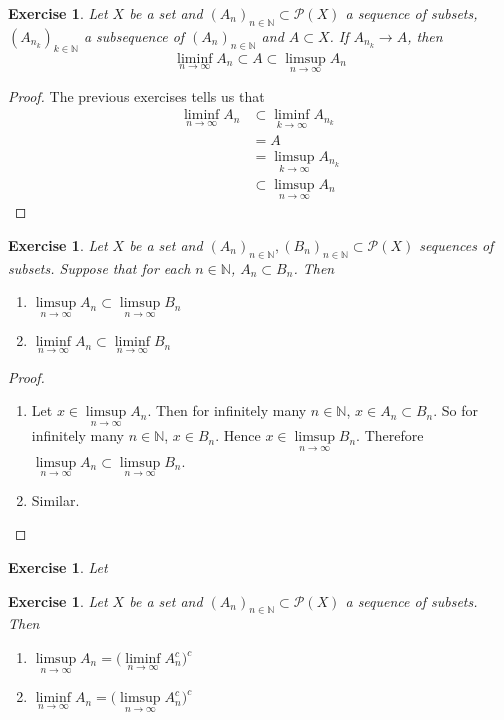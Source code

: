 \documentclass[12pt]{amsart}
\newtheorem{ex}[thm]{Exercise}
\newcommand{\N}{\mathbb{N}}
\newcommand{\MP}{\mathcal{P}}
\begin{document}
\begin{ex}
Let $X$ be a set and $(A_n)_{n \in \N} \subset \MP(X)$ a sequence of subsets, $(A_{n_k})_{k \in \N}$ a subsequence of $(A_n)_{n \in \N}$ and $A \subset X$. If $A_{n_k} \rightarrow A$, then $$\liminf\limits_{n \rightarrow \infty}A_n \subset A \subset \limsup\limits_{n \rightarrow \infty}A_n$$
\end{ex}

\begin{proof}
The previous exercises tells us that 
\begin{align*}
\liminf\limits_{n \rightarrow \infty}A_n
& \subset \liminf\limits_{k \rightarrow \infty}A_{n_k} \\
&= A \\
&= \limsup\limits_{k \rightarrow \infty}A_{n_k} \\
& \subset \limsup\limits_{n \rightarrow \infty}A_n
\end{align*}
\end{proof}

\begin{ex}
Let $X$ be a set and $(A_n)_{n \in \N}, (B_n)_{n \in \N} \subset \MP(X)$ sequences of subsets. Suppose that for each $n \in \N$, $A_n \subset B_n$. Then 
\begin{enumerate}
\item $\limsup\limits_{n \rightarrow \infty}A_n \subset \limsup\limits_{n \rightarrow \infty}B_n$
\item $\liminf\limits_{n \rightarrow \infty}A_n \subset \liminf\limits_{n \rightarrow \infty}B_n$
\end{enumerate}
\end{ex}

\begin{proof}\
\begin{enumerate}
\item Let $x \in \limsup\limits_{n \rightarrow \infty}A_n$. Then for infinitely many $n \in \N$, $x \in A_n \subset B_n$. So for infinitely many $n \in \N$, $x \in B_n$. Hence $x \in \limsup\limits_{n \rightarrow \infty}B_n$. Therefore $\limsup\limits_{n \rightarrow \infty}A_n \subset \limsup\limits_{n \rightarrow \infty}B_n$.
\item Similar.
\end{enumerate}
\end{proof}

\begin{ex}
Let 
\end{ex}

\begin{ex}
Let $X$ be a set and $(A_n)_{n \in \N} \subset \MP(X)$ a sequence of subsets. Then 
\begin{enumerate}
\item $\limsup\limits_{n \rightarrow \infty}A_n = \bigg(\liminf\limits_{n \rightarrow \infty}A_n^c \bigg)^c$
\item $\liminf\limits_{n \rightarrow \infty}A_n = \bigg(\limsup\limits_{n \rightarrow \infty}A_n^c \bigg)^c$
\end{enumerate}
\end{ex}
\end{document}
